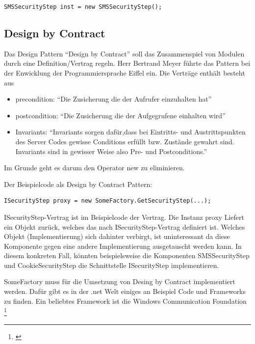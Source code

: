 \begin{verbatim}
SMSSecurityStep inst = new SMSSecurityStep();
\end{verbatim}

\subsection{Design by Contract}\label{design-by-contract}

Das Design Pattern ``Design by Contract'' soll das Zusammenspiel von
Modulen durch eine Definition/Vertrag regeln. Herr Bertrand Meyer führte
das Pattern bei der Enwicklung der Programmiersprache Eiffel ein. Die
Verträge enthält besteht aus

\begin{itemize}
\tightlist
\item
  precondition: ``Die Zusicherung die der Aufrufer einzuhalten hat''
\item
  postcondition: ``Die Zusicherung die der Aufgegrufene einhalten wird''
\item
  Invariants: ``Invariants sorgen dafür,dass bei Eintritts- und
  Austrittspunkten des Server Codes gewisse Conditions erfüllt bzw.
  Zustände gewahrt sind. Invariants sind in gewisser Weise also Pre- und
  Postconditions.''
\end{itemize}

Im Grunde geht es darum den Operator new zu eliminieren.

Der Beispielcode als Design by Contract Pattern:

\begin{verbatim}
ISecurityStep proxy = new SomeFactory.GetSecurityStep(...);
\end{verbatim}

ISecurityStep-Vertrag ist im Beispielcode der Vertrag. Die Instanz proxy
Liefert ein Objekt zurück, welches das nach ISecurityStep-Vertrag
definiert ist. Welches Objekt (Implementierung) sich dahinter verbirgt,
ist uninteressant da diese Komponente gegen eine andere Implementierung
ausgetauscht werden kann. In diesem konkreten Fall, könnten
beispielsweise die Komponenten SMSSecurityStep und CookieSecurityStep
die Schnittstelle ISecurityStep implementieren.

SomeFactory muss für die Umsetzung von Desing by Contract implementiert
werden. Dafür gibt es in der .net Welt einiges an Beispiel Code und
Frameworks zu finden. Ein beliebtes Framework ist die Windows
Communication Foundation \footnote{\autocite{design-By-Contract}}

